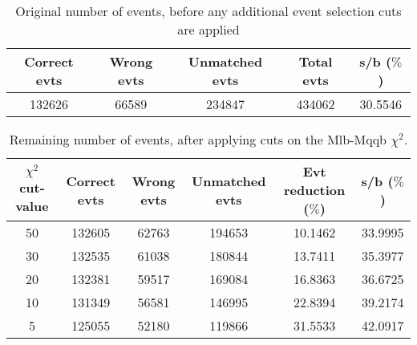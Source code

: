 \documentclass{article}
\begin{document}
 

 \begin{abstract} 
 
   The tables in this document represent the influence of the additional event selection cuts that were applied in order to reduce the number of selected events for CPU reasons. \\ 
   The considered cuts are rather basic and are merely developed to reduce the number of so-called wrong events \\ 
   \begin{itemize} 
     \item Cut on Mlb-Mqqb $\chi^{2}$ distribution 
     \item Cut on top and W-mass window 
   \end{itemize} 
 
   \textbf{Created on :} \today 
 \end{abstract} 
 
 \begin{table}[h!t] 
  \caption{Original number of events, before any additional event selection cuts are applied} 
  \centering 
   \begin{tabular}{c|c|c|c|c} 
     Correct evts    & Wrong evts     & Unmatched evts      &  Total evts & s/b ($\%$)     \\ 
     \hline
     132626   &   66589  & 234847 & 434062  & 30.5546 
 
   \end{tabular} 
 \end{table} 
 
 \begin{table}[h!t] 
  \caption{Remaining number of events, after applying cuts on the Mlb-Mqqb $\chi^{2}$.} 
  \centering 
   \begin{tabular}{c|c|c|c|c|c} 
     $\chi^{2}$ cut-value    & Correct evts    & Wrong evts     & Unmatched evts  & Evt reduction ($\%$)    & s/b ($\%$)     \\ 
     \hline
     50  &   132605  &  62763  &  194653  &  10.1462 & 33.9995 \\ 
     30  &   132535  &  61038  &  180844  &  13.7411 & 35.3977 \\ 
     20  &   132381  &  59517  &  169084  &  16.8363 & 36.6725 \\ 
     10  &   131349  &  56581  &  146995  &  22.8394 & 39.2174 \\ 
     5  &   125055  &  52180  &  119866  &  31.5533 & 42.0917   \end{tabular} 
 \end{table} 
 
\end{document}
